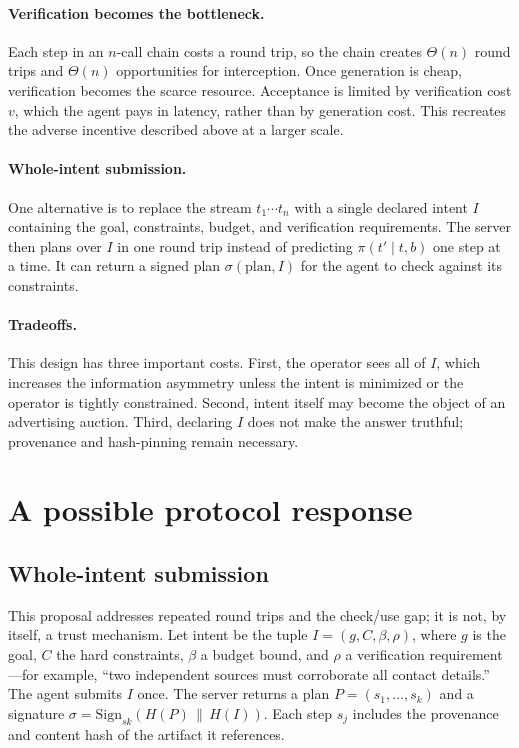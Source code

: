 \documentclass[11pt]{article}
\begin{document}
\paragraph{Verification becomes the bottleneck.} Each step in an $n$-call chain costs a round trip,
so the chain creates $\Theta(n)$ round trips and $\Theta(n)$ opportunities for interception. Once
generation is cheap, verification becomes the scarce resource. Acceptance is limited by verification
cost $v$, which the agent pays in latency, rather than by generation cost. This recreates the adverse
incentive described above at a larger scale.

\paragraph{Whole-intent submission.} One alternative is to replace the stream
$t_1\cdots t_n$ with a single declared intent $I$ containing the goal, constraints, budget, and
verification requirements. The server then plans over $I$ in one round trip instead of predicting
$\pi(t'\mid t,b)$ one step at a time. It can return a signed plan $\sigma(\text{plan},I)$ for the agent
to check against its constraints.

\paragraph{Tradeoffs.} This design has three important costs. First, the operator sees all of $I$,
which increases the information asymmetry unless the intent is minimized or the operator is tightly
constrained. Second, intent itself may become the object of an advertising auction. Third, declaring
$I$ does not make the answer truthful; provenance and hash-pinning remain necessary.

\section{A possible protocol response}
\subsection{Whole-intent submission}
This proposal addresses repeated round trips and the check/use gap; it is not, by itself, a trust
mechanism. Let intent be the tuple $I=(g,C,\beta,\rho)$, where $g$ is the goal, $C$ the hard
constraints, $\beta$ a budget bound, and $\rho$ a verification requirement---for example,
``two independent sources must corroborate all contact details.'' The agent submits $I$ once. The
server returns a plan $P=(s_1,\dots,s_k)$ and a signature
$\sigma=\mathrm{Sign}_{sk}(H(P)\,\|\,H(I))$. Each step $s_j$ includes the provenance and content hash
of the artifact it references.
\end{document}
